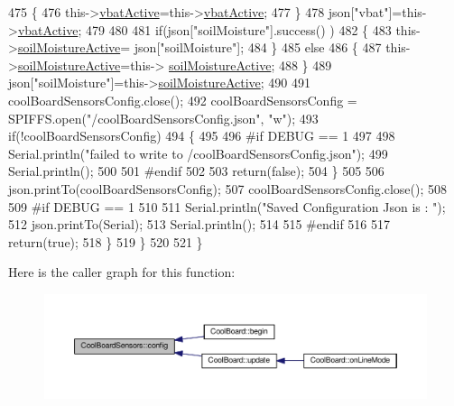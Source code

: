 \begin{DoxyCode}
475             \{
476                 this->\hyperlink{classCoolBoardSensors_af5039ad760b0ff0aa7eee16c55e81702}{vbatActive}=this->\hyperlink{classCoolBoardSensors_af5039ad760b0ff0aa7eee16c55e81702}{vbatActive};
477             \}
478             json[\textcolor{stringliteral}{"vbat"}]=this->\hyperlink{classCoolBoardSensors_af5039ad760b0ff0aa7eee16c55e81702}{vbatActive};
479 
480             
481             \textcolor{keywordflow}{if}(json[\textcolor{stringliteral}{"soilMoisture"}].success() )
482             \{           
483                 this->\hyperlink{classCoolBoardSensors_a31983eecc0f9cd000e1f912206ea4dc8}{soilMoistureActive}= json[\textcolor{stringliteral}{"soilMoisture"}];
484             \}
485             \textcolor{keywordflow}{else}
486             \{
487                 this->\hyperlink{classCoolBoardSensors_a31983eecc0f9cd000e1f912206ea4dc8}{soilMoistureActive}=this->
      \hyperlink{classCoolBoardSensors_a31983eecc0f9cd000e1f912206ea4dc8}{soilMoistureActive};
488             \}
489             json[\textcolor{stringliteral}{"soilMoisture"}]=this->\hyperlink{classCoolBoardSensors_a31983eecc0f9cd000e1f912206ea4dc8}{soilMoistureActive};
490 
491             coolBoardSensorsConfig.close();         
492             coolBoardSensorsConfig = SPIFFS.open(\textcolor{stringliteral}{"/coolBoardSensorsConfig.json"}, \textcolor{stringliteral}{"w"});          
493             \textcolor{keywordflow}{if}(!coolBoardSensorsConfig)
494             \{
495             
496 \textcolor{preprocessor}{            #if DEBUG == 1}
497 
498                 Serial.println(\textcolor{stringliteral}{"failed to write to /coolBoardSensorsConfig.json"});
499                 Serial.println();
500             
501 \textcolor{preprocessor}{            #endif}
502 
503                 \textcolor{keywordflow}{return}(\textcolor{keyword}{false});          
504             \}  
505 
506             json.printTo(coolBoardSensorsConfig);
507             coolBoardSensorsConfig.close();         
508             
509 \textcolor{preprocessor}{        #if DEBUG == 1}
510 
511             Serial.println(\textcolor{stringliteral}{"Saved Configuration Json is : "});
512             json.printTo(Serial);
513             Serial.println();
514         
515 \textcolor{preprocessor}{        #endif}
516 
517             \textcolor{keywordflow}{return}(\textcolor{keyword}{true}); 
518         \}
519     \}   
520 
521 \}
\end{DoxyCode}
Here is the caller graph for this function\+:\nopagebreak
\begin{figure}[H]
\begin{center}
\leavevmode
\includegraphics[width=350pt]{classCoolBoardSensors_a9a218895c5423375c33c08f2c56fb23a_icgraph}
\end{center}
\end{figure}
